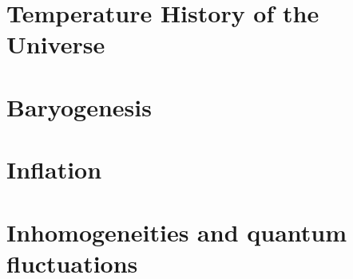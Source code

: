 \documentclass[]{article}
\begin{document}
\section{Temperature History of the Universe}
\section{Baryogenesis}
\section{Inflation}
\section{Inhomogeneities and quantum fluctuations}

\printglossaries


\raggedright

\end{document}
